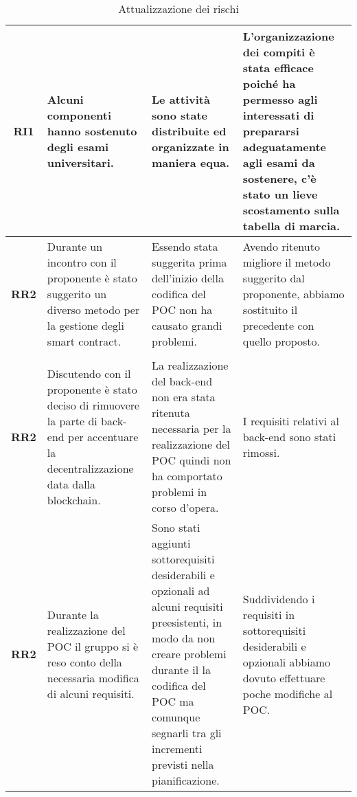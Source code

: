 \begin{table}[H]
\begin{tabular}{c|p{5cm}|p{5cm}|p{5cm}}
    \hline
    \textbf{RI1} & Alcuni componenti hanno sostenuto degli esami universitari.                                                                                     & Le attività sono state distribuite ed organizzate in maniera equa.                                                                                                                                                                 & L'organizzazione dei compiti è stata efficace poiché ha permesso agli interessati di prepararsi adeguatamente agli esami da sostenere, c'è stato un lieve scostamento sulla tabella di marcia. \\
    \hline
    \textbf{RR2} & Durante un incontro con il proponente è stato suggerito un diverso metodo per la gestione degli smart contract\glo{}.                           & Essendo stata suggerita prima dell'inizio della codifica del POC non ha causato grandi problemi.                                                                                                                                   & Avendo ritenuto migliore il metodo suggerito dal proponente, abbiamo sostituito il precedente con quello proposto.                                                                             \\
    \hline
    \rowcolor[HTML]{6BC26B}
    \multicolumn{4}{c}{\textbf{Codifica Proof of Concept}}                                                                                                                                                                                                                                                                                                                                                                                                                                                                                                                                               \\
    \hline
    \textbf{RR2} & Discutendo con il proponente è stato deciso di rimuovere la parte di back-end per accentuare la decentralizzazione data dalla blockchain\glo{}. & La realizzazione del back-end non era stata ritenuta necessaria per la realizzazione del POC quindi non ha comportato problemi in corso d'opera. & I requisiti relativi al back-end sono stati rimossi.\\
    \textbf{RR2} & Durante la realizzazione del POC il gruppo si è reso conto della necessaria modifica di alcuni requisiti. & Sono stati aggiunti sottorequisiti desiderabili e opzionali ad alcuni requisiti preesistenti, in modo da non creare problemi durante il la codifica del POC ma comunque segnarli tra gli incrementi previsti nella pianificazione. & Suddividendo i requisiti in sottorequisiti desiderabili e opzionali abbiamo dovuto effettuare poche modifiche al POC.\\
  \end{tabular}
  \caption{Attualizzazione dei rischi}
\end{table}